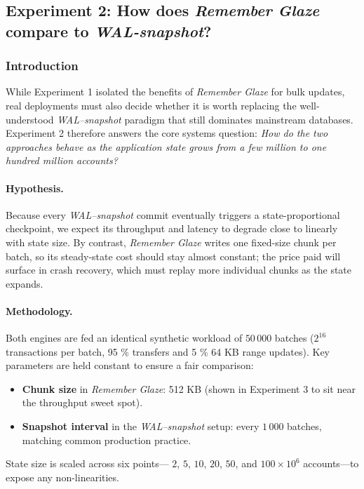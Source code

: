 \documentclass[conference]{IEEEtran}
\begin{document}
\subsection{Experiment 2: How does \textit{Remember Glaze} compare to \textit{WAL-snapshot}?}

\subsubsection{Introduction}
While Experiment 1 isolated the benefits of \textit{Remember Glaze} for bulk
updates, real deployments must also decide whether it is worth replacing the
well-understood \textit{WAL–snapshot} paradigm that still dominates mainstream
databases.  Experiment 2 therefore answers the core systems question:
\emph{How do the two approaches behave as the application state grows from a
few million to one hundred million accounts?}

\paragraph{Hypothesis.}
Because every \textit{WAL–snapshot} commit eventually triggers a
state-proportional checkpoint, we expect its throughput and latency to degrade
close to linearly with state size.  By contrast, \textit{Remember Glaze} writes
one fixed-size chunk per batch, so its steady-state cost should stay almost
constant; the price paid will surface in crash recovery, which must replay
more individual chunks as the state expands.

\paragraph{Methodology.}
Both engines are fed an identical synthetic workload of
\(50\,000\) batches (\(2^{16}\) transactions per batch, 95 \% transfers and
5 \% 64 KB range updates).  
Key parameters are held constant to ensure a fair comparison:

\begin{itemize}
  \item \textbf{Chunk size} in \textit{Remember Glaze}: 512 KB
        (shown in Experiment 3 to sit near the throughput sweet spot).
  \item \textbf{Snapshot interval} in the \textit{WAL–snapshot} setup:
        every \(1\,000\) batches, matching common production practice.
\end{itemize}

State size is scaled across six points—
\(2\), \(5\), \(10\), \(20\), \(50\), and
\(100\times10^{6}\) accounts—to expose any non-linearities.
\end{document}
